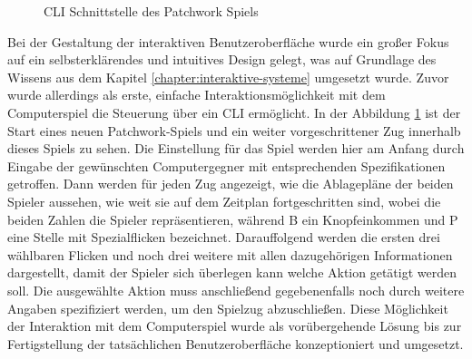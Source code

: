 \begin{figure}[!ht]
{}
    \caption[CLI Schnittstelle des Patchwork Spiels]{\acs{CLI} Schnittstelle des Patchwork Spiels}
    \label{fig:patchwork-console-ui}
\end{figure}

Bei der Gestaltung der interaktiven Benutzeroberfläche wurde ein großer Fokus auf ein selbsterklärendes und intuitives Design gelegt, was auf Grundlage des Wissens aus dem Kapitel \ref{chapter:interaktive-systeme} umgesetzt wurde. Zuvor wurde allerdings als erste, einfache Interaktionsmöglichkeit mit dem Computerspiel die Steuerung über ein \ac{CLI} ermöglicht. In der Abbildung \ref{fig:patchwork-console-ui} ist der Start eines neuen Patchwork-Spiels und ein weiter vorgeschrittener Zug innerhalb dieses Spiels zu sehen. Die Einstellung für das Spiel werden hier am Anfang durch Eingabe der gewünschten Computergegner mit entsprechenden Spezifikationen getroffen. Dann werden für jeden Zug angezeigt, wie die Ablagepläne der beiden Spieler aussehen, wie weit sie auf dem Zeitplan fortgeschritten sind, wobei die beiden Zahlen die Spieler repräsentieren, während B ein Knopfeinkommen und P eine Stelle mit Spezialflicken bezeichnet. Darauffolgend werden die ersten drei wählbaren Flicken und noch drei weitere mit allen dazugehörigen Informationen dargestellt, damit der Spieler sich überlegen kann welche Aktion getätigt werden soll. Die ausgewählte Aktion muss anschließend gegebenenfalls noch durch weitere Angaben spezifiziert werden, um den Spielzug abzuschließen. Diese Möglichkeit der Interaktion mit dem Computerspiel wurde als vorübergehende Lösung bis zur Fertigstellung der tatsächlichen Benutzeroberfläche konzeptioniert und umgesetzt.

